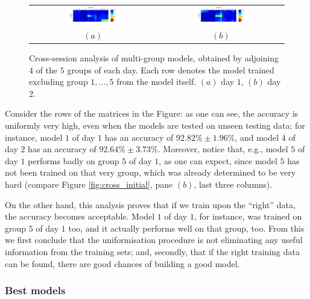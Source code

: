 \begin{figure}[!ht] \centering
  \begin{tabular}{cc}
    \includegraphics[width=0.45\textwidth]{figs/fig_resCross_day1_big} & \includegraphics[width=0.45\textwidth]{figs/fig_resCross_day2_big} \\
    $(a)$ & $(b)$ \\
  \end{tabular}
  \caption{Cross-session analysis of multi-group models, obtained by adjoining $4$
    of the $5$ groups of each day. Each row denotes the model trained
    excluding group $1,\ldots,5$ from the model itself. $(a)$ day $1$, $(b)$ day $2$.}
  \label{fig:bigmodels}
\end{figure}

Consider the rows of the matrices in the Figure: as one can see, the
accuracy is uniformly very high, even when the models are tested on
unseen testing data; for instance, model $1$ of day $1$ has an
accuracy of $92.82\% \pm 1.96\%$, and model $4$ of day $2$ has an
accuracy of $92.64\% \pm 3.73\%$. Moreover, notice that, e.g., model
$5$ of day $1$ performs badly on group $5$ of day $1$, as one can
expect, since model $5$ has not been trained on that very group, which
was already determined to be very hard (compare Figure
\ref{fig:cross_initial}, pane $(b)$, last three columns).

On the other hand, this analysis proves that if we train upon the
``right'' data, the accuracy becomes acceptable. Model $1$ of day $1$,
for instance, was trained on group $5$ of day $1$ too, and it actually
performs well on that group, too. From this we first conclude that the
uniformisation procedure is not eliminating any useful information
from the training sets; and, secondly, that if the right training data
can be found, there are good chances of building a good model.

\subsubsection{Best models}

